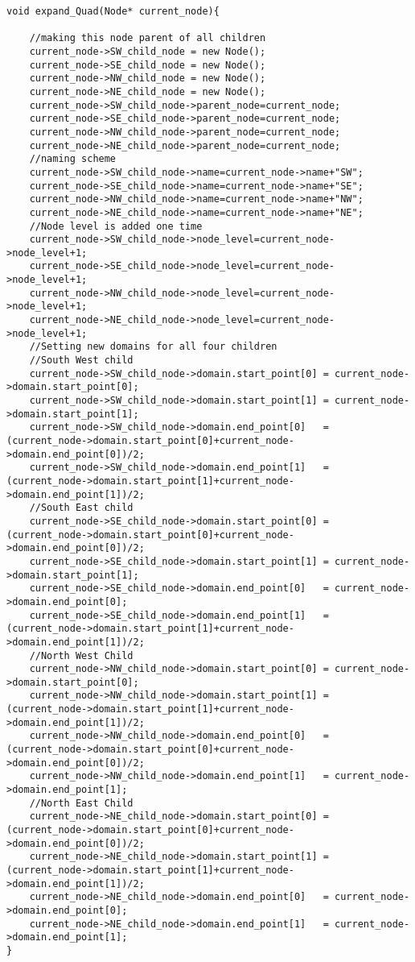 \begin{lstlisting}[caption= Source code for solution, label=code:sol]
void expand_Quad(Node* current_node){

	//making this node parent of all children
	current_node->SW_child_node = new Node();
	current_node->SE_child_node = new Node();
	current_node->NW_child_node = new Node();
	current_node->NE_child_node = new Node();
	current_node->SW_child_node->parent_node=current_node;
	current_node->SE_child_node->parent_node=current_node;
	current_node->NW_child_node->parent_node=current_node;
	current_node->NE_child_node->parent_node=current_node;
	//naming scheme
	current_node->SW_child_node->name=current_node->name+"SW";
	current_node->SE_child_node->name=current_node->name+"SE";
	current_node->NW_child_node->name=current_node->name+"NW";
	current_node->NE_child_node->name=current_node->name+"NE";
	//Node level is added one time
	current_node->SW_child_node->node_level=current_node->node_level+1;
	current_node->SE_child_node->node_level=current_node->node_level+1;
	current_node->NW_child_node->node_level=current_node->node_level+1;
	current_node->NE_child_node->node_level=current_node->node_level+1;
	//Setting new domains for all four children
	//South West child
	current_node->SW_child_node->domain.start_point[0] = current_node->domain.start_point[0];
	current_node->SW_child_node->domain.start_point[1] = current_node->domain.start_point[1];
	current_node->SW_child_node->domain.end_point[0]   = (current_node->domain.start_point[0]+current_node->domain.end_point[0])/2;
	current_node->SW_child_node->domain.end_point[1]   = (current_node->domain.start_point[1]+current_node->domain.end_point[1])/2;
	//South East child
	current_node->SE_child_node->domain.start_point[0] = (current_node->domain.start_point[0]+current_node->domain.end_point[0])/2;
	current_node->SE_child_node->domain.start_point[1] = current_node->domain.start_point[1];
	current_node->SE_child_node->domain.end_point[0]   = current_node->domain.end_point[0];
	current_node->SE_child_node->domain.end_point[1]   = (current_node->domain.start_point[1]+current_node->domain.end_point[1])/2;
	//North West Child
	current_node->NW_child_node->domain.start_point[0] = current_node->domain.start_point[0];
	current_node->NW_child_node->domain.start_point[1] = (current_node->domain.start_point[1]+current_node->domain.end_point[1])/2;
	current_node->NW_child_node->domain.end_point[0]   = (current_node->domain.start_point[0]+current_node->domain.end_point[0])/2;
	current_node->NW_child_node->domain.end_point[1]   = current_node->domain.end_point[1];
	//North East Child
	current_node->NE_child_node->domain.start_point[0] = (current_node->domain.start_point[0]+current_node->domain.end_point[0])/2;
	current_node->NE_child_node->domain.start_point[1] = (current_node->domain.start_point[1]+current_node->domain.end_point[1])/2;
	current_node->NE_child_node->domain.end_point[0]   = current_node->domain.end_point[0];
	current_node->NE_child_node->domain.end_point[1]   = current_node->domain.end_point[1];
}


\end{lstlisting}
